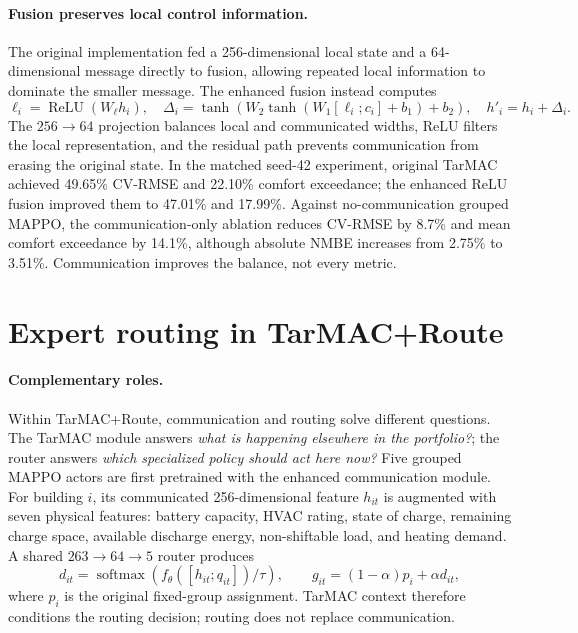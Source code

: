 \documentclass{article}
\begin{document}
\paragraph{Fusion preserves local control information.}
The original implementation fed a 256-dimensional local state and a
64-dimensional message directly to fusion, allowing repeated local information
to dominate the smaller message. The enhanced fusion instead computes
\begin{equation}
\ell_i=\operatorname{ReLU}(W_\ell h_i),\quad
\Delta_i=\tanh\!\left(W_2\tanh(W_1[\ell_i;c_i]+b_1)+b_2\right),\quad
h'_i=h_i+\Delta_i .
\label{eq:hybrid}
\end{equation}
The $256\!\rightarrow\!64$ projection balances local and communicated widths,
ReLU filters the local representation, and the residual path prevents
communication from erasing the original state. In the matched seed-42
experiment, original TarMAC achieved 49.65\% CV-RMSE and 22.10\% comfort
exceedance; the enhanced ReLU fusion improved them to 47.01\% and 17.99\%.
Against no-communication grouped MAPPO, the communication-only ablation reduces
CV-RMSE by 8.7\% and mean
comfort exceedance by 14.1\%, although absolute NMBE increases from 2.75\% to
3.51\%. Communication improves the balance, not every metric.


\section{Expert routing in TarMAC+Route}


\paragraph{Complementary roles.}
Within TarMAC+Route, communication and routing solve different questions. The
TarMAC module answers
\emph{what is happening elsewhere in the portfolio?}; the router answers
\emph{which specialized policy should act here now?} Five grouped MAPPO actors
are first pretrained with the enhanced communication module. For building $i$,
its communicated
256-dimensional feature $h_{it}$ is augmented with seven physical features:
battery capacity, HVAC rating, state of charge, remaining charge space,
available discharge energy, non-shiftable load, and heating demand. A shared
$263\!\rightarrow\!64\!\rightarrow\!5$ router produces
\begin{equation}
d_{it}=\operatorname{softmax}(f_\theta([h_{it};q_{it}])/\tau),\qquad
g_{it}=(1-\alpha)p_i+\alpha d_{it},
\label{eq:gate}
\end{equation}
where $p_i$ is the original fixed-group assignment. TarMAC context therefore
conditions the routing decision; routing does not replace communication.
\end{document}
